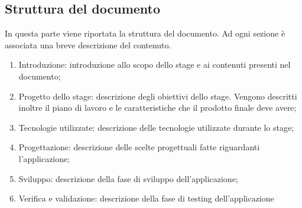 \documentclass[../Tesi.tex]{subfiles}
\begin{document}
	\subsection{Struttura del documento}
		In questa parte viene riportata la struttura del documento. Ad ogni sezione è associata una breve descrizione del contenuto.
		\begin{enumerate}
			\item Introduzione: introduzione allo scopo dello stage e ai contenuti presenti nel documento;
			\item Progetto dello stage: descrizione degli obiettivi dello stage. Vengono descritti inoltre il piano di lavoro e le caratteristiche che il prodotto finale deve avere;
			\item Tecnologie utilizzate: descrizione delle tecnologie utilizzate durante lo stage;
			\item Progettazione: descrizione delle scelte progettuali fatte riguardanti l'applicazione;
			\item Sviluppo: descrizione della fase di sviluppo dell'applicazione;
			\item Verifica e validazione: descrizione della fase di testing dell'applicazione 
		\end{enumerate}
\end{document}
